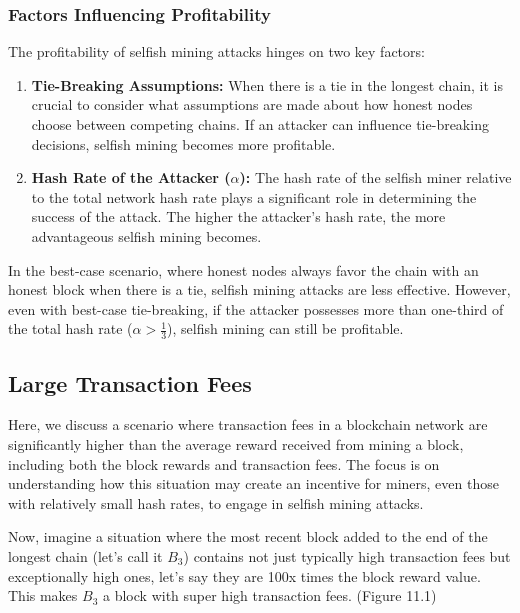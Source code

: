 \subsubsection{Factors Influencing Profitability}
The profitability of selfish mining attacks hinges on two key factors:

\begin{enumerate}
    \item \textbf{Tie-Breaking Assumptions:} When there is a tie in the longest chain, it is crucial to consider what assumptions are made about how honest nodes choose between competing chains. If an attacker can influence tie-breaking decisions, selfish mining becomes more profitable.
    
    \item \textbf{Hash Rate of the Attacker ($\alpha$):} The hash rate of the selfish miner relative to the total network hash rate plays a significant role in determining the success of the attack. The higher the attacker's hash rate, the more advantageous selfish mining becomes.
\end{enumerate}
In the best-case scenario, where honest nodes always favor the chain with an honest block when there is a tie, selfish mining attacks are less effective. However, even with best-case tie-breaking, if the attacker possesses more than one-third of the total hash rate ($\alpha > \frac{1}{3}$), selfish mining can still be profitable.

\subsection{Large Transaction Fees}

Here, we discuss a scenario where transaction fees in a blockchain network are significantly higher than the average reward received from mining a block, including both the block rewards and transaction fees. The focus is on understanding how this situation may create an incentive for miners, even those with relatively small hash rates, to engage in selfish mining attacks.


Now, imagine a situation where the most recent block added to the end of the longest chain (let's call it $B_3$) contains not just typically high transaction fees but exceptionally high ones, let's say they are 100x times the block reward value. This makes $B_3$ a block with super high transaction fees. (Figure 11.1)

